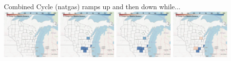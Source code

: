 \documentclass[xcolor=dvipsnames]{beamer}
\begin{document}
\begin{frame}

  Combined Cycle (natgas) ramps up and then down while... \\
  \includegraphics[width=0.22\textwidth]{includes/no_leakage_no_shutdowns_CC_r0.png}
  \includegraphics[width=0.22\textwidth]{includes/no_leakage_no_shutdowns_CC_r2.png}
  \includegraphics[width=0.22\textwidth]{includes/no_leakage_no_shutdowns_CC_r3.png}
  \includegraphics[width=0.22\textwidth]{includes/no_leakage_no_shutdowns_CC_r4.png}




\end{frame}
\end{document}
